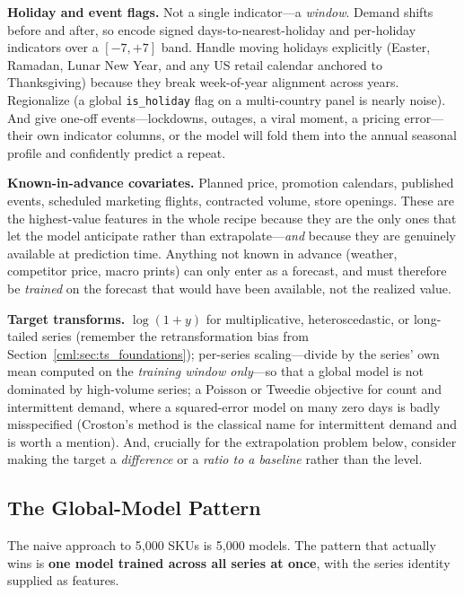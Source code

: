 \textbf{Holiday and event flags.} Not a single indicator---a \emph{window}. Demand shifts before and after, so encode signed days-to-nearest-holiday and per-holiday indicators over a $[-7, +7]$ band. Handle moving holidays explicitly (Easter, Ramadan, Lunar New Year, and any US retail calendar anchored to Thanksgiving) because they break week-of-year alignment across years. Regionalize (a global \texttt{is\_holiday} flag on a multi-country panel is nearly noise). And give one-off events---lockdowns, outages, a viral moment, a pricing error---their own indicator columns, or the model will fold them into the annual seasonal profile and confidently predict a repeat.

\textbf{Known-in-advance covariates.} Planned price, promotion calendars, published events, scheduled marketing flights, contracted volume, store openings. These are the highest-value features in the whole recipe because they are the only ones that let the model anticipate rather than extrapolate---\emph{and} because they are genuinely available at prediction time. Anything not known in advance (weather, competitor price, macro prints) can only enter as a forecast, and must therefore be \emph{trained} on the forecast that would have been available, not the realized value.

\textbf{Target transforms.} $\log(1+y)$ for multiplicative, heteroscedastic, or long-tailed series (remember the retransformation bias from Section~\ref{cml:sec:ts_foundations}); per-series scaling---divide by the series' own mean computed on the \emph{training window only}---so that a global model is not dominated by high-volume series; a Poisson or Tweedie objective for count and intermittent demand, where a squared-error model on many zero days is badly misspecified (Croston's method is the classical name for intermittent demand and is worth a mention). And, crucially for the extrapolation problem below, consider making the target a \emph{difference} or a \emph{ratio to a baseline} rather than the level.

\subsection{The Global-Model Pattern}

The naive approach to 5{,}000 SKUs is 5{,}000 models. The pattern that actually wins is \textbf{one model trained across all series at once}, with the series identity supplied as features.

